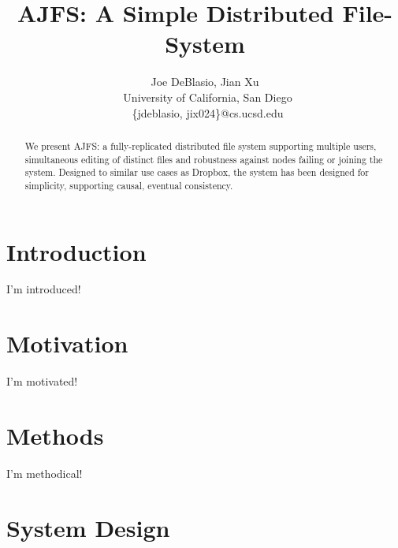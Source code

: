 \documentclass[preprint]{sig-alternate-10pt}
\begin{document}



\title{AJFS: A Simple Distributed File-System}

\author{Joe DeBlasio, Jian Xu\\\
       University of California, San Diego \\\
       \{jdeblasio, jix024\}@cs.ucsd.edu}

\maketitle

\begin{abstract}
    We present AJFS: a fully-replicated distributed file system supporting
    multiple users, simultaneous editing of distinct files and robustness
    against nodes failing or joining the system. Designed to similar use cases
    as Dropbox, the system has been designed for simplicity, supporting causal,
    eventual consistency.
\end{abstract}

\section{Introduction}
I'm introduced!

\section{Motivation}
I'm motivated!

\section{Methods}
I'm methodical!

\section{System Design}
    
\end{document}
